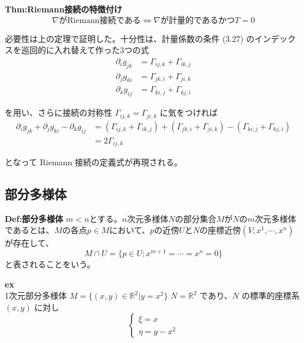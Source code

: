 \documentclass[a4paper,11pt]{jsarticle}
\numberwithin{equation}{section}
\begin{document}
\begin{itembox}[l]{\textbf{Thm:Riemann接続の特徴付け}}
    \begin{equation}
        \nabla \text{がRiemann接続である} \Leftrightarrow \nabla \text{が計量的であるかつ} T=0
    \end{equation}

\end{itembox}
必要性は上の定理で証明した。十分性は、計量係数の条件 (3.27) のインデックスを巡回的に入れ替えて作った3つの式
\begin{align}
    \partial_i g_{jk} &= \Gamma_{ij,k} + \Gamma_{ik,j} \\
    \partial_j g_{ki} &= \Gamma_{jk,i} + \Gamma_{ji,k} \\
    \partial_k g_{ij} &= \Gamma_{ki,j} + \Gamma_{kj,i}
\end{align}

を用い、さらに接続の対称性 \(\Gamma_{ij,k} = \Gamma_{ji,k}\) に気をつければ
\begin{align}
    \partial_i g_{jk} + \partial_j g_{ki} - \partial_k g_{ij} &= (\Gamma_{ij,k} + \Gamma_{ik,j}) + (\Gamma_{jk,i} + \Gamma_{ji,k}) - (\Gamma_{ki,j} + \Gamma_{kj,i}) \\
    &= 2 \Gamma_{ij,k}
\end{align}

となって Riemann 接続の定義式が再現される。\hfill\qedsymbol

\subsection{部分多様体}
\begin{itembox}[l]{\textbf{Def:部分多様体}}
    $m<n$とする。$n$次元多様体$N$の部分集合$M$が$N$の$m$次元多様体であるとは、$M$の各点$p \in M$において、$p$の近傍$U$と$N$の座標近傍$(V;x^1,\cdots,x^n)$が存在して、
    \begin{equation}
        M \cap U = \{p \in U ; x^{m+1} = \cdots = x^n = 0\}
    \end{equation}
    と表されることをいう。
\end{itembox}

\textbf{ex}\\
1次元部分多様体 \( M = \{(x, y) \in \mathbb{R}^2 | y = x^2\} \)
\(N = \mathbb{R}^2\) であり、\(N\) の標準的座標系 \((x, y)\) に対し
\begin{equation}
\begin{cases}
\xi = x \\
\eta = y - x^2
\end{cases}
\tag{3.243}
\end{equation}
\end{document}
